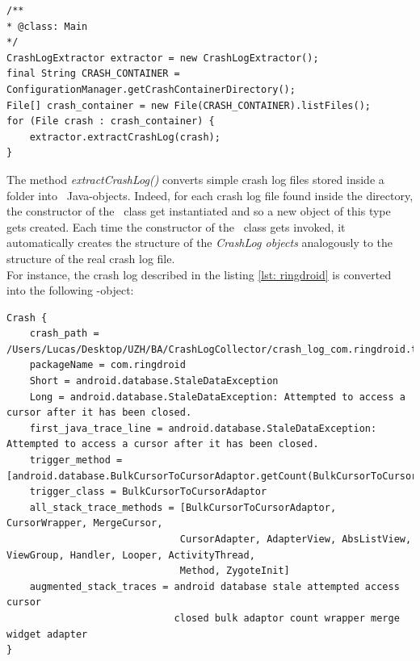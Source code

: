 \begin{lstlisting}[caption=\Extractor\ code snippet converting crash files into CrashLog objects,label={lst: extractor}]
/**
* @class: Main
*/
CrashLogExtractor extractor = new CrashLogExtractor();
final String CRASH_CONTAINER = ConfigurationManager.getCrashContainerDirectory();
File[] crash_container = new File(CRASH_CONTAINER).listFiles();
for (File crash : crash_container) {
	extractor.extractCrashLog(crash);
}
\end{lstlisting} 
The method \textit{extractCrashLog()} converts simple crash log files stored inside a folder into \Crash\ Java-objects. 
Indeed, for each crash log file found inside the directory, the constructor of the \Crash\ class get instantiated and so a new object of this type gets created. Each time the constructor of the \Crash\ class gets invoked, it automatically creates the structure of the \textit{CrashLog objects} analogously to the structure of the real crash log file. \\
For instance, the crash log described in the listing \ref{lst: ringdroid} is converted into the following \Crash-object: 

\begin{lstlisting}[caption=\Crash-object,basicstyle=\fontsize{6}{8}\ttfamily, label={lst: crashobject}]
Crash {
	crash_path = /Users/Lucas/Desktop/UZH/BA/CrashLogCollector/crash_log_com.ringdroid.txt
	packageName = com.ringdroid
	Short = android.database.StaleDataException
	Long = android.database.StaleDataException: Attempted to access a cursor after it has been closed.
	first_java_trace_line = android.database.StaleDataException: Attempted to access a cursor after it has been closed.
	trigger_method = [android.database.BulkCursorToCursorAdaptor.getCount(BulkCursorToCursorAdaptor.java:70)]
	trigger_class = BulkCursorToCursorAdaptor
	all_stack_trace_methods = [BulkCursorToCursorAdaptor, CursorWrapper, MergeCursor,
	 						  CursorAdapter, AdapterView, AbsListView, ViewGroup, Handler, Looper, ActivityThread, 
	 						  Method, ZygoteInit]
	augmented_stack_traces = android database stale attempted access cursor 
						     closed bulk adaptor count wrapper merge widget adapter 
}
\end{lstlisting}






